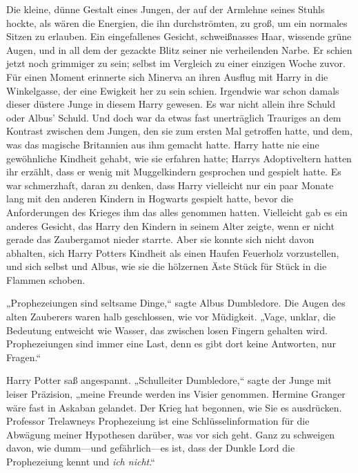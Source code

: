 Die kleine, dünne Gestalt eines Jungen, der auf der Armlehne seines Stuhls hockte, als wären die Energien, die ihn durchströmten, zu groß, um ein normales Sitzen zu erlauben. Ein eingefallenes Gesicht, schweißnasses Haar, wissende grüne Augen, und in all dem der gezackte Blitz seiner nie verheilenden Narbe. Er schien jetzt noch grimmiger zu sein; selbst im Vergleich zu einer einzigen Woche zuvor. Für einen Moment erinnerte sich Minerva an ihren Ausflug mit Harry in die Winkelgasse, der eine Ewigkeit her zu sein schien. Irgendwie war schon damals dieser düstere Junge in diesem Harry gewesen. Es war nicht allein ihre Schuld oder Albus' Schuld. Und doch war da etwas fast unerträglich Trauriges an dem Kontrast zwischen dem Jungen, den sie zum ersten Mal getroffen hatte, und dem, was das magische Britannien aus ihm gemacht hatte. Harry hatte nie eine gewöhnliche Kindheit gehabt, wie sie erfahren hatte; Harrys Adoptiveltern hatten ihr erzählt, dass er wenig mit Muggelkindern gesprochen und gespielt hatte. Es war schmerzhaft, daran zu denken, dass Harry vielleicht nur ein paar Monate lang mit den anderen Kindern in Hogwarts gespielt hatte, bevor die Anforderungen des Krieges ihm das alles genommen hatten. Vielleicht gab es ein anderes Gesicht, das Harry den Kindern in seinem Alter zeigte, wenn er nicht gerade das Zaubergamot nieder starrte. Aber sie konnte sich nicht davon abhalten, sich Harry Potters Kindheit als einen Haufen Feuerholz vorzustellen, und sich selbst und Albus, wie sie die hölzernen Äste Stück für Stück in die Flammen schoben.

„Prophezeiungen sind seltsame Dinge,“ sagte Albus Dumbledore. Die Augen des alten Zauberers waren halb geschlossen, wie vor Müdigkeit. „Vage, unklar, die Bedeutung entweicht wie Wasser, das zwischen losen Fingern gehalten wird. Prophezeiungen sind immer eine Last, denn es gibt dort keine Antworten, nur Fragen.“

Harry Potter saß angespannt. „Schulleiter Dumbledore,“ sagte der Junge mit leiser Präzision, „meine Freunde werden ins Visier genommen. Hermine Granger wäre fast in Askaban gelandet. Der Krieg hat begonnen, wie Sie es ausdrücken. Professor Trelawneys Prophezeiung ist eine Schlüsselinformation für die Abwägung meiner Hypothesen darüber, was vor sich geht. Ganz zu schweigen davon, wie dumm—und gefährlich—es ist, dass der Dunkle Lord die Prophezeiung kennt und \emph{ich nicht}.“

